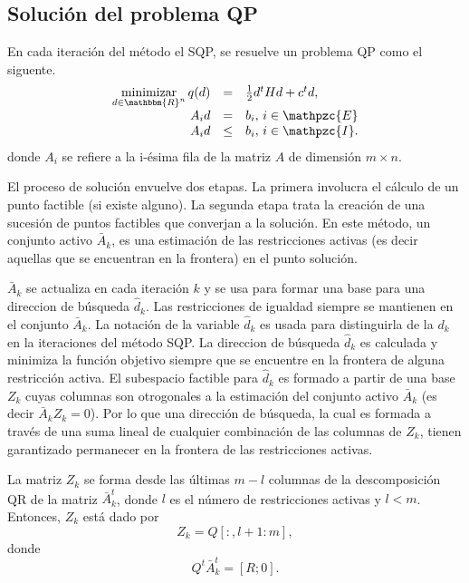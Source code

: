 \documentclass[a4paper,10pt]{book}
\newcommand{\R}{\mathbbm{R}}
\newcommand{\Rn}{\R^n}
\newcommand{\cI}{\mathpzc{I}}
\newcommand{\cE}{\mathpzc{E}}
\begin{document}
\subsection{Solución del problema QP}

En cada iteración del método el SQP, se resuelve un problema QP como el siguente.
\begin{equation}\label{probqp}
    \begin{array}{rcl}
    \displaystyle \mathop{\mathrm{minimizar}}_{d\in\Rn}q(d)&=&\frac{1}{2}d^tHd+c^td,\\
    A_id&=&b_i,\,i\in\cE\\
    A_id&\leq&b_i,\,i\in\cI.
    \end{array}
\end{equation}
donde $A_i$ se refiere a la i-ésima fila de la matriz $A$ de dimensión $m\times n$.

El proceso de solución envuelve dos etapas. La primera involucra el cálculo de un punto factible (si existe alguno). La segunda etapa trata la creación de una sucesión de puntos factibles que converjan a la solución. En este método, un conjunto activo $\bar A_k$, es una estimación de las restricciones activas (es decir aquellas que se encuentran en la frontera) en el punto solución.

$\bar A_k$ se actualiza en cada iteración $k$ y se usa para formar una base para una direccion de búsqueda $\hat{d}_k$. Las restricciones de igualdad siempre se mantienen en el conjunto $\bar A_k$. La notación de la variable $\hat{d}_k$ es usada para distinguirla de la $d_k$ en la iteraciones del método SQP. La direccion de búsqueda $\hat{d}_k$ es calculada y minimiza la función objetivo siempre que se encuentre en la frontera de alguna restricción activa. El subespacio factible para $\hat{d}_k$ es formado a partir de una base $Z_k$ cuyas columnas son otrogonales a la estimación del conjunto activo $\bar A_k$ (es decir $\bar A_kZ_k=0$). Por lo que una dirección de búsqueda, la cual es formada a través de una suma lineal de cualquier combinación de las columnas de $Z_k$, tienen garantizado permanecer en la frontera de las restricciones activas.

La matriz $Z_k$ se forma desde las últimas $m-l$ columnas de la descomposición QR de la matriz $\bar A_k^t$, donde $l$ es el número de restricciones activas y $l<m$. Entonces, $Z_k$ está dado por $$Z_k=Q[:,l+1:m],$$
donde $$Q^t\bar A_k^t=[R;0].$$
\end{document}
